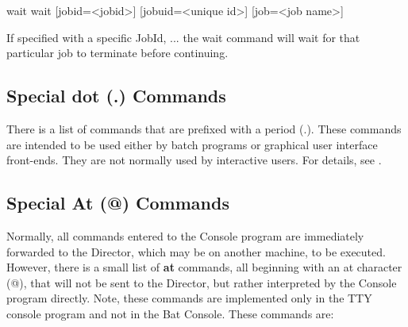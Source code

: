 \begin{description}
\begin{bconsole}{wait}
wait [jobid=<jobid>] [jobuid=<unique id>] [job=<job name>]
\end{bconsole}

   If specified with a specific JobId, ... the wait command will wait
   for that particular job to terminate before continuing.

\end{description}

\subsection{Special dot (.) Commands}
\label{dotcommands}

There is a list of commands that are prefixed with a period (.). These
commands are intended to be used either by batch programs or graphical user
interface front-ends. They are not normally used by interactive users.
For details, see \bareosDeveloperGuideDotCommands.


\subsection{Special At (@) Commands}
\label{atcommands}

Normally, all commands entered to the Console program are immediately
forwarded to the Director, which may be on another machine, to be executed.
However, there is a small list of {\bf at} commands, all beginning with an at
character (@), that will not be sent to the Director, but rather interpreted
by the Console program directly. Note, these commands are implemented only in
the TTY console program and not in the Bat Console. These commands are:

